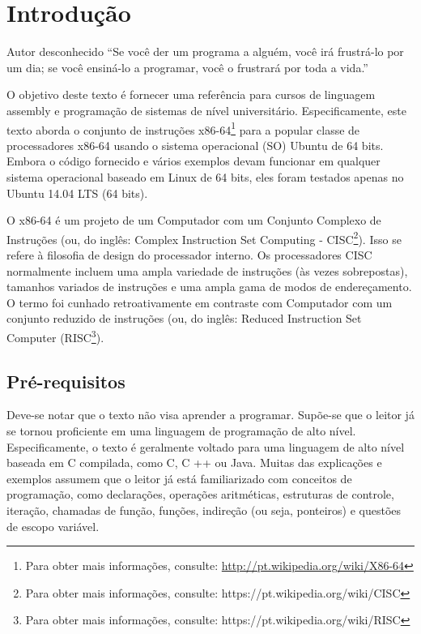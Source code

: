 \chapter{Introdução}

\begin{chapquote}{Autor desconhecido}
``Se você der um programa a alguém, você irá
frustrá-lo por um dia; se você ensiná-lo a
programar, você o frustrará por toda a vida.''

\end{chapquote}
\label{cap1}
O objetivo deste texto é fornecer uma referência para cursos de linguagem assembly e programação de sistemas de nível universitário. Especificamente, este texto aborda o conjunto de instruções x86-64\footnote{Para obter mais informações, consulte: \url{http://pt.wikipedia.org/wiki/X86-64}} para a popular classe de processadores x86-64 usando o sistema operacional (SO) Ubuntu de 64 bits. Embora o código fornecido e vários exemplos devam funcionar em qualquer sistema operacional baseado em Linux de 64 bits, eles foram testados apenas no Ubuntu 14.04 LTS (64 bits).

O x86-64 é um projeto de um Computador com um Conjunto Complexo de Instruções (ou, do inglês: Complex Instruction Set Computing - CISC\footnote{Para obter mais informações, consulte: https://pt.wikipedia.org/wiki/CISC}). Isso se refere à filosofia de design do processador interno. Os processadores CISC normalmente incluem uma ampla variedade de instruções (às vezes sobrepostas), tamanhos variados de instruções e uma ampla gama de modos de endereçamento. O termo foi cunhado retroativamente em contraste com Computador com um conjunto reduzido de instruções (ou, do inglês: Reduced Instruction Set Computer (RISC\footnote{Para obter mais informações, consulte: https://pt.wikipedia.org/wiki/RISC}).

\section{Pré-requisitos}
Deve-se notar que o texto não visa aprender a programar. Supõe-se que o leitor já se tornou proficiente em uma linguagem de programação de alto nível. Especificamente, o texto é geralmente voltado para uma linguagem de alto nível baseada em C compilada, como C, C ++ ou Java. Muitas das explicações e exemplos assumem que o leitor já está familiarizado com conceitos de programação, como declarações, operações aritméticas, estruturas de controle, iteração, chamadas de função, funções, indireção (ou seja, ponteiros) e questões de escopo variável.

